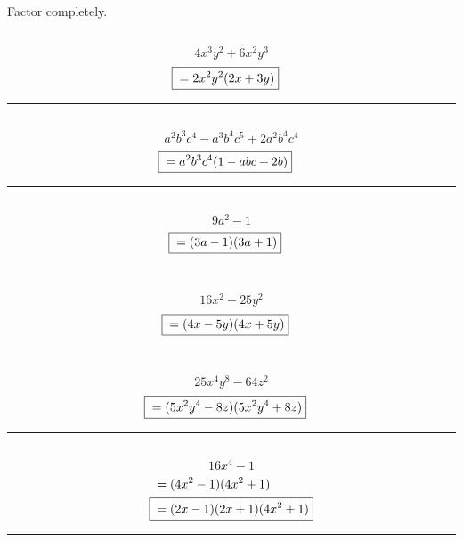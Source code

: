 


\section{}
	Factor completely.

	\subsection{}
		\[4x^3y^2 + 6x^2y^3\]
		\begin{align*}
			\Aboxed{{} &= 2x^2y^2(2x + 3y)}
		\end{align*}
		\hrule{}

	\subsection{}
		\[a^2b^3c^4 - a^3b^4c^5 + 2a^2b^4c^4\]
		\begin{align*}
			\Aboxed{{} &= a^2b^3c^4(1 - abc + 2b)}
		\end{align*}
		\hrule{}

	\subsection{}
		\[9a^2 - 1\]
		\begin{align*}
			\Aboxed{{} &= (3a - 1)(3a + 1)}
		\end{align*}
		\hrule{}

	\subsection{}
		\[16x^2 - 25y^2\]
		\begin{align*}
			\Aboxed{{} &= (4x - 5y)(4x + 5y)}
		\end{align*}
		\hrule{}

	\subsection{}
		\[25x^4y^8 - 64z^2\]
		\begin{align*}
			\Aboxed{{} &= (5x^2y^4 - 8z)(5x^2y^4 + 8z)}
		\end{align*}
		\hrule{}

	\subsection{}
		\[16x^4 - 1\]
		\begin{align*}
			&= (4x^2 - 1)(4x^2 + 1) \\
			\Aboxed{{} &= (2x - 1)(2x + 1)(4x^2 + 1)}
		\end{align*}
		\hrule{}

